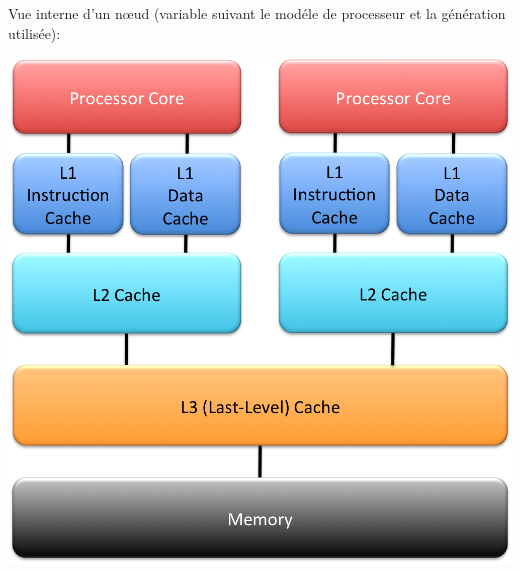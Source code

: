 \documentclass{beamer}
\begin{document}
\begin{frame}
Vue interne d'un n\oe ud (variable suivant le mod\'ele de processeur et la g\'en\'eration utilis\'ee):

\begin{center}
\includegraphics[scale=0.3]{architecture2}
\end{center}

\end{frame}
\end{document}
